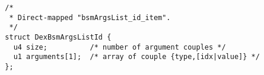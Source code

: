 {\scriptsize \begin{verbatim}
  /*
   * Direct-mapped "bsmArgsList_id_item".
   */
  struct DexBsmArgsListId {
    u4 size;          /* number of argument couples */
    u1 arguments[1];  /* array of couple {type,[idx|value]} */
  };
\end{verbatim} }
